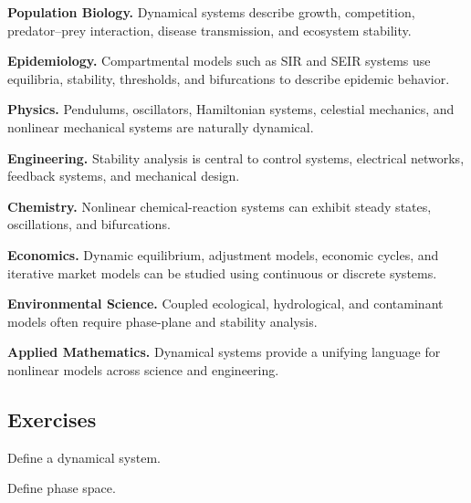 \begin{applicationbox}

\textbf{Population Biology.}
Dynamical systems describe growth, competition, predator--prey
interaction, disease transmission, and ecosystem stability.

\medskip

\textbf{Epidemiology.}
Compartmental models such as SIR and SEIR systems use equilibria,
stability, thresholds, and bifurcations to describe epidemic behavior.

\medskip

\textbf{Physics.}
Pendulums, oscillators, Hamiltonian systems, celestial mechanics, and
nonlinear mechanical systems are naturally dynamical.

\medskip

\textbf{Engineering.}
Stability analysis is central to control systems, electrical networks,
feedback systems, and mechanical design.

\medskip

\textbf{Chemistry.}
Nonlinear chemical-reaction systems can exhibit steady states,
oscillations, and bifurcations.

\medskip

\textbf{Economics.}
Dynamic equilibrium, adjustment models, economic cycles, and iterative
market models can be studied using continuous or discrete systems.

\medskip

\textbf{Environmental Science.}
Coupled ecological, hydrological, and contaminant models often require
phase-plane and stability analysis.

\medskip

\textbf{Applied Mathematics.}
Dynamical systems provide a unifying language for nonlinear models across
science and engineering.

\end{applicationbox}

\subsection{Exercises}
\label{subsec:dynamical-systems-exercises}

\begin{exercise}[1]
Define a dynamical system.
\end{exercise}

\begin{exercise}[1]
Define phase space.
\end{exercise}

